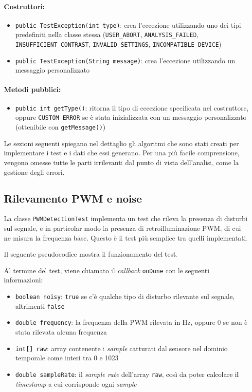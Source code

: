 \paragraph{Costruttori:}\begin{itemize}
	\item \texttt{public TestException(int type)}: crea l'eccezione utilizzando uno dei tipi predefiniti nella classe stessa (\texttt{USER\_ABORT}, \texttt{ANALYSIS\_FAILED}, \texttt{INSUFFICIENT\_CONTRAST}, \texttt{INVALID\_SETTINGS}, \texttt{INCOMPATIBLE\_DEVICE})
	\item \texttt{public TestException(String message)}: crea l'eccezione utilizzando un messaggio personalizzato
\end{itemize}

\paragraph{Metodi pubblici:}\begin{itemize}
	\item \texttt{public int getType()}: ritorna il tipo di eccezione specificata nel costruttore, oppure \texttt{CUSTOM\_ERROR} se è stata inizializzata con un messaggio personalizzato (ottenibile con \texttt{getMessage()})
\end{itemize}

Le sezioni seguenti spiegano nel dettaglio gli algoritmi che sono stati creati per implementare i test e i dati che essi generano. Per una più facile comprensione, vengono omesse tutte le parti irrilevanti dal punto di vista dell'analisi, come la gestione degli errori.

\subsection{Rilevamento PWM e noise}
La classe \texttt{PWMDetectionTest} implementa un test che rileva la presenza di disturbi sul segnale, e in particolar modo la presenza di retroilluminazione PWM, di cui ne misura la frequenza base. Questo è il test più semplice tra quelli implementati.

Il seguente pseudocodice mostra il funzionamento del test.


Al termine del test, viene chiamato il \textit{callback} \texttt{onDone} con le seguenti informazioni:\begin{itemize}
	\item \texttt{boolean noisy}: \texttt{true} se c'è qualche tipo di disturbo rilevante sul segnale, altrimenti \texttt{false}
	\item \texttt{double frequency}: la frequenza della PWM rilevata in Hz, oppure 0 se non è stata rilevata alcuna frequenza
	\item \texttt{int[] raw}: array contenente i \textit{sample} catturati dal sensore nel dominio temporale come interi tra 0 e 1023
	\item \texttt{double sampleRate}: il \textit{sample rate} dell'array \texttt{raw}, così da poter calcolare il \textit{timestamp} a cui corrisponde ogni \textit{sample}
\end{itemize}

